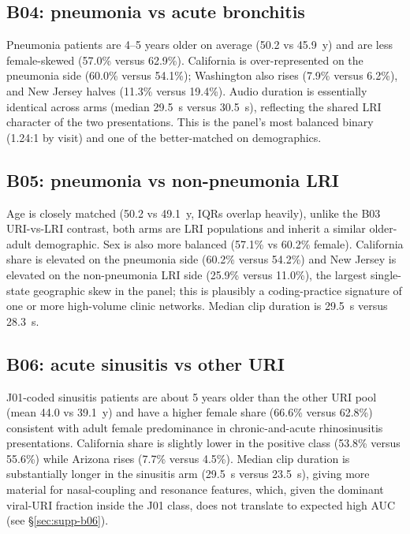 \documentclass[utf8]{frontiers_suppmat} %
\begin{document}
\subsection{B04: pneumonia vs acute bronchitis}

Pneumonia patients are 4--5 years older on average (50.2 vs 45.9~y)
and are less female-skewed (57.0\% versus 62.9\%). California is
over-represented on the pneumonia side (60.0\% versus 54.1\%);
Washington also rises (7.9\% versus 6.2\%), and New Jersey halves
(11.3\% versus 19.4\%). Audio duration is essentially identical
across arms (median 29.5~s versus 30.5~s), reflecting the shared
LRI character of the two presentations. This is the panel's most
balanced binary (1.24:1 by visit) and one of the better-matched on
demographics.

\subsection{B05: pneumonia vs non-pneumonia LRI}

Age is closely matched (50.2 vs 49.1~y, IQRs overlap heavily),
unlike the B03 URI-vs-LRI contrast, both arms are LRI
populations and inherit a similar older-adult demographic. Sex is
also more balanced (57.1\% vs 60.2\% female). California share is
elevated on the pneumonia side (60.2\% versus 54.2\%) and New Jersey
is elevated on the non-pneumonia LRI side (25.9\% versus 11.0\%),
the largest single-state geographic skew in the panel; this is
plausibly a coding-practice signature of one or more high-volume
clinic networks. Median clip duration is 29.5~s versus 28.3~s.

\subsection{B06: acute sinusitis vs other URI}

J01-coded sinusitis patients are about 5 years older than the other
URI pool (mean 44.0 vs 39.1~y) and have a higher female share
(66.6\% versus 62.8\%) consistent with adult female predominance in
chronic-and-acute rhinosinusitis presentations. California share is
slightly lower in the positive class (53.8\% versus 55.6\%) while
Arizona rises (7.7\% versus 4.5\%). Median clip duration is
substantially longer in the sinusitis arm (29.5~s versus 23.5~s),
giving more material for nasal-coupling and resonance features,
which, given the dominant viral-URI fraction inside the J01 class,
does not translate to expected high AUC (see \S\ref{sec:supp-b06}).
\end{document}
